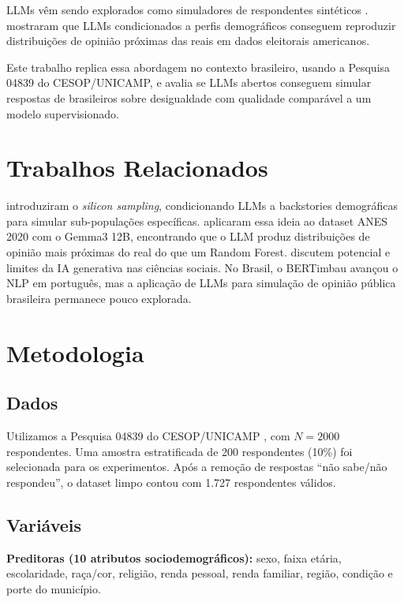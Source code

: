 \documentclass[12pt]{article}
\begin{document}
LLMs vêm sendo explorados como simuladores de respondentes sintéticos
\cite{argyle2023,park2023}. \cite{miranda2025} mostraram que LLMs
condicionados a perfis demográficos conseguem reproduzir distribuições de
opinião próximas das reais em dados eleitorais americanos.

Este trabalho replica essa abordagem no contexto brasileiro, usando a
Pesquisa 04839 do CESOP/UNICAMP, e avalia se LLMs abertos conseguem simular
respostas de brasileiros sobre desigualdade com qualidade comparável a um
modelo supervisionado.


\section{Trabalhos Relacionados}

\cite{argyle2023} introduziram o \textit{silicon sampling}, condicionando
LLMs a backstories demográficas para simular sub-populações específicas.
\cite{miranda2025} aplicaram essa ideia ao dataset ANES 2020 com o Gemma3 12B,
encontrando que o LLM produz distribuições de opinião mais próximas do real
do que um Random Forest. \cite{bail2024} discutem potencial e limites da IA
generativa nas ciências sociais. No Brasil, o BERTimbau \cite{souza2020}
avançou o NLP em português, mas a aplicação de LLMs para simulação de opinião
pública brasileira permanece pouco explorada.


\section{Metodologia}

\subsection{Dados}

Utilizamos a Pesquisa 04839 do CESOP/UNICAMP \cite{cesop2023}, com $N=2000$
respondentes. Uma amostra estratificada de 200 respondentes (10\%) foi
selecionada para os experimentos. Após a remoção de respostas ``não sabe/não
respondeu'', o dataset limpo contou com 1.727 respondentes válidos.

\subsection{Variáveis}

\textbf{Preditoras (10 atributos sociodemográficos):} sexo, faixa etária,
escolaridade, raça/cor, religião, renda pessoal, renda familiar, região,
condição e porte do município.
\end{document}
